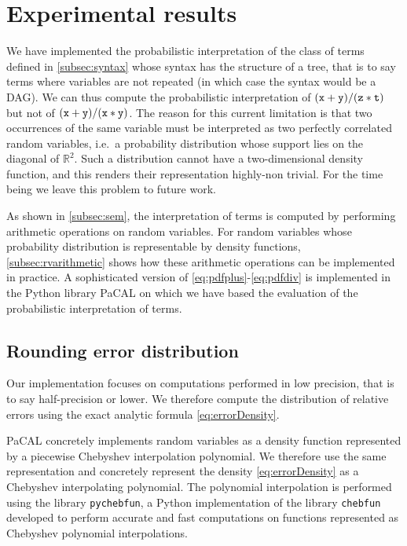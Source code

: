 \documentclass[10pt,conference]{IEEEtran}
\newcommand{\ie}{i.e.\ }
\newcommand{\R}{\mathbb{R}}
\begin{document}
\section{Experimental results}\label{sec:exp}

We have implemented the probabilistic interpretation of the class of terms defined in \cref{subsec:syntax} whose syntax has the structure of a tree, that is to say terms where variables are not repeated (in which case the syntax would be a DAG). We can thus compute the probabilistic interpretation of $\tt (x+y)/(z\ast t)$ but not of $\tt (x+y)/(x\ast y)$. The reason for this current limitation is that two occurrences of the same variable must be interpreted as two perfectly correlated random variables, \ie a probability distribution whose support lies on the diagonal of $\R^2$. Such a distribution cannot have a two-dimensional density function, and this renders their representation highly-non trivial. For the time being we leave this problem to future work.

As shown in \cref{subsec:sem}, the interpretation of terms is computed by performing arithmetic operations on random variables. For random variables whose probability distribution is representable by density functions, \cref{subsec:rvarithmetic} shows how these arithmetic operations can be implemented in practice. A sophisticated version of \cref{eq:pdfplus}-\cref{eq:pdfdiv} is implemented in the Python library PaCAL
\cite{jaroszewicz2012arithmetic}\cite{korzen2014pacal} on which we have based the evaluation of the probabilistic interpretation of terms.

\subsection{Rounding error distribution}
Our implementation focuses on computations performed in low precision, that is to say half-precision or lower. We therefore compute the distribution of relative errors using the exact analytic formula \cref{eq:errorDensity}.

PaCAL concretely implements random variables as a density function represented by a piecewise Chebyshev interpolation polynomial. We therefore use the same representation and concretely represent the density \cref{eq:errorDensity} as a Chebyshev interpolating polynomial. The polynomial interpolation is performed using the library \texttt{pychebfun}, a Python implementation of the library \texttt{chebfun} \cite{battles2004extension} developed to perform accurate and fast computations on functions represented as Chebyshev polynomial interpolations.
\end{document}
